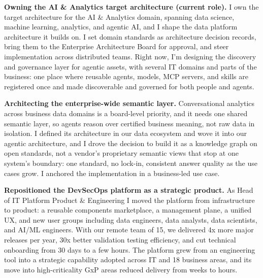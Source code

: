\documentclass[11pt, a4paper]{awesome-cv}
\begin{document}
\newpage

\newcommand{\plead}[1]{{\bodyfont\bfseries\color{darktext}#1}}
\setlength{\parindent}{0pt}
\setlength{\parskip}{0.7em}


{
{}  \raggedbottom


\plead{Owning the AI \& Analytics target architecture (current role).} I own the target architecture for the AI \& Analytics domain, spanning data science, machine learning, analytics, and agentic AI, and I shape the data platform architecture it builds on. I set domain standards as architecture decision records, bring them to the Enterprise Architecture Board for approval, and steer implementation across distributed teams. Right now, I'm designing the discovery and governance layer for agentic assets, with several IT domains and parts of the business: one place where reusable agents, models, MCP servers, and skills are registered once and made discoverable and governed for both people and agents.

\plead{Architecting the enterprise-wide semantic layer.} Conversational analytics across business data domains is a board-level priority, and it needs one shared semantic layer, so agents reason over certified business meaning, not raw data in isolation. I defined its architecture in our data ecosystem and wove it into our agentic architecture, and I drove the decision to build it as a knowledge graph on open standards, not a vendor's proprietary semantic views that stop at one system's boundary: one standard, no lock-in, consistent answer quality as the use cases grow. I anchored the implementation in a business-led use case.

\plead{Repositioned the DevSecOps platform as a strategic product.} As Head of IT Platform Product \& Engineering I moved the platform from infrastructure to product: a reusable components marketplace, a management plane, a unified UX, and new user groups including data engineers, data analysts, data scientists, and AI/ML engineers. With our remote team of 15, we delivered 4x more major releases per year, 30x better validation testing efficiency, and cut technical onboarding from 30 days to a few hours. The platform grew from an engineering tool into a strategic capability adopted across IT and 18 business areas, and its move into high-criticality GxP areas reduced delivery from weeks to hours.

}
\end{document}
